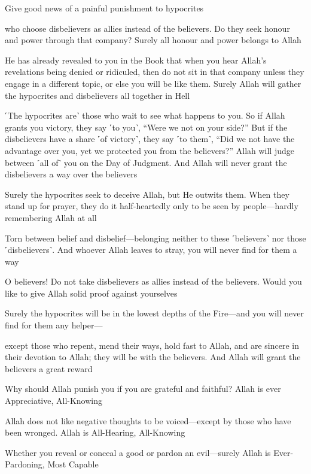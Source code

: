 Give good news of a painful punishment to hypocrites

who choose disbelievers as allies instead of the believers. Do they seek honour and power through that company? Surely all honour and power belongs to Allah

He has already revealed to you in the Book that when you hear Allah’s revelations being denied or ridiculed, then do not sit in that company unless they engage in a different topic, or else you will be like them. Surely Allah will gather the hypocrites and disbelievers all together in Hell

˹The hypocrites are˺ those who wait to see what happens to you. So if Allah grants you victory, they say ˹to you˺, “Were we not on your side?” But if the disbelievers have a share ˹of victory˺, they say ˹to them˺, “Did we not have the advantage over you, yet we protected you from the believers?” Allah will judge between ˹all of˺ you on the Day of Judgment. And Allah will never grant the disbelievers a way over the believers

Surely the hypocrites seek to deceive Allah, but He outwits them. When they stand up for prayer, they do it half-heartedly only to be seen by people—hardly remembering Allah at all

Torn between belief and disbelief—belonging neither to these ˹believers˺ nor those ˹disbelievers˺. And whoever Allah leaves to stray, you will never find for them a way

O believers! Do not take disbelievers as allies instead of the believers. Would you like to give Allah solid proof against yourselves

Surely the hypocrites will be in the lowest depths of the Fire—and you will never find for them any helper—

except those who repent, mend their ways, hold fast to Allah, and are sincere in their devotion to Allah; they will be with the believers. And Allah will grant the believers a great reward

Why should Allah punish you if you are grateful and faithful? Allah is ever Appreciative, All-Knowing

Allah does not like negative thoughts to be voiced—except by those who have been wronged. Allah is All-Hearing, All-Knowing

Whether you reveal or conceal a good or pardon an evil—surely Allah is Ever-Pardoning, Most Capable

